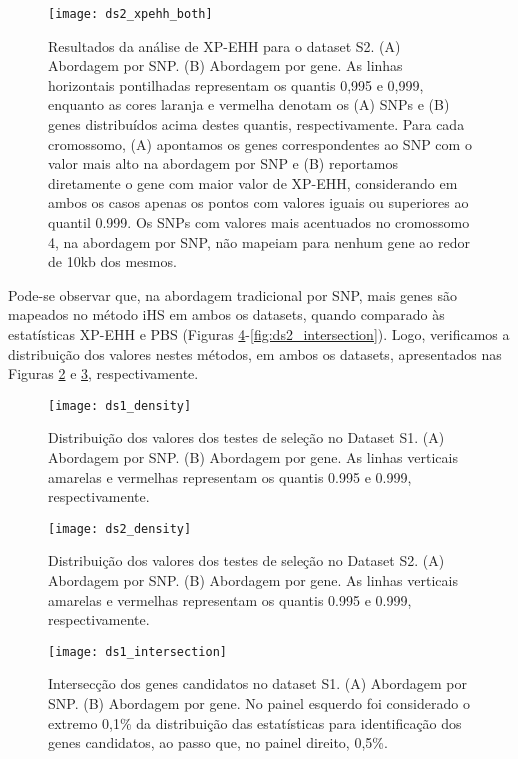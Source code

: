 \begin{figure}[!htbp] %
    \centering
    \texttt{[image: ds2\_xpehh\_both]}
    \caption[Resultados da análise de XP-EHH para o dataset S2.]{Resultados da análise de XP-EHH para o dataset S2. (A) Abordagem por SNP. (B) Abordagem por gene. As linhas horizontais pontilhadas representam os quantis 0,995 e 0,999, enquanto as cores laranja e vermelha denotam os (A) SNPs e (B) genes distribuídos acima destes quantis, respectivamente. Para cada cromossomo, (A) apontamos os genes correspondentes ao SNP com o valor mais alto na abordagem por SNP e (B) reportamos diretamente o gene com maior valor de XP-EHH, considerando em ambos os casos apenas os pontos com valores iguais ou superiores ao quantil 0.999. Os SNPs com valores mais acentuados no cromossomo 4, na abordagem por SNP, não mapeiam para nenhum gene ao redor de 10kb dos mesmos.}
    \label{fig:ds2_xpehh_both}
\end{figure}

Pode-se observar que, na abordagem tradicional por SNP, mais genes são mapeados no método iHS em ambos os datasets, quando comparado às estatísticas XP-EHH e PBS (Figuras \ref{fig:ds1_intersection}-\ref{fig:ds2_intersection}). Logo, verificamos a distribuição dos valores nestes métodos, em ambos os datasets, apresentados nas Figuras \ref{fig:ds1_density} e \ref{fig:ds2_density}, respectivamente.

\begin{figure}[p] %
    \centering
    \texttt{[image: ds1\_density]}
    \caption[Distribuição dos valores dos testes de seleção no Dataset S1.]{Distribuição dos valores dos testes de seleção no Dataset S1. (A) Abordagem por SNP. (B) Abordagem por gene. As linhas verticais amarelas e vermelhas representam os quantis 0.995 e 0.999, respectivamente.}
    \label{fig:ds1_density}
\end{figure}

\begin{figure}[p] %
    \centering
    \texttt{[image: ds2\_density]}
    \caption[Distribuição dos valores dos testes de seleção no Dataset S2.]{Distribuição dos valores dos testes de seleção no Dataset S2. (A) Abordagem por SNP. (B) Abordagem por gene. As linhas verticais amarelas e vermelhas representam os quantis 0.995 e 0.999, respectivamente.}
    \label{fig:ds2_density}
\end{figure}

\begin{figure}[!htbp] %
    \centering
    \texttt{[image: ds1\_intersection]}
    \caption[Intersecção dos genes candidatos no dataset S1.]{Intersecção dos genes candidatos no dataset S1. (A) Abordagem por SNP. (B) Abordagem por gene. No painel esquerdo foi considerado o extremo 0,1\% da distribuição das estatísticas para identificação dos genes candidatos, ao passo que, no painel direito, 0,5\%.}
    \label{fig:ds1_intersection}
\end{figure}


